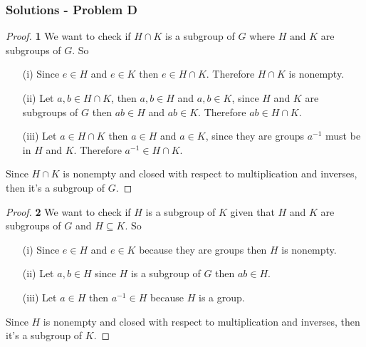 \documentclass[11pt]{article}
\begin{document}
	\subsubsection*{Solutions - Problem D}
	\begin{proof}{\textbf{1}}
		We want to check if $H \cap K$ is a subgroup of $G$ where $H \text{ and } K$ are subgroups of $G$. So
		\begin{itemize}
			\item[(i)] Since $e \in H$ and $e \in K$ then $e \in H \cap K$. Therefore $H \cap K$ is nonempty.
			\item[(ii)] Let $a,b \in H \cap K$, then $a,b \in H$ and $a,b \in K$, since $H$ and $K$ are subgroups of $G$ then $ab \in H$ and $ab \in K$. Therefore $ab \in H \cap K$.
			\item[(iii)] Let $a \in H \cap K$ then $a \in H$ and $a \in K$, since they are groups $a^{-1}$ must be in $H$ and $K$. Therefore $a^{-1} \in H \cap K$.
		\end{itemize}
		Since $H \cap K$ is nonempty and closed with respect to multiplication and inverses, then it's a subgroup of $G$.
	\end{proof}
	\begin{proof}{\textbf{2}}
		We want to check if $H$ is a subgroup of $K$ given that $H$ and $K$ are subgroups of $G$ and $H \subseteq K$. So
		\begin{itemize}
			\item[(i)] Since $e \in H$ and $e \in K$ because they are groups then $H$ is nonempty.
			\item[(ii)] Let $a,b \in H$ since $H$ is a subgroup of $G$ then $ab \in H$.
			\item[(iii)] Let $a \in H $ then $a^{-1} \in H$ because $H$ is a group.
		\end{itemize}
		Since $H$ is nonempty and closed with respect to multiplication and inverses, then it's a subgroup of $K$.
	\end{proof}
\end{document}
